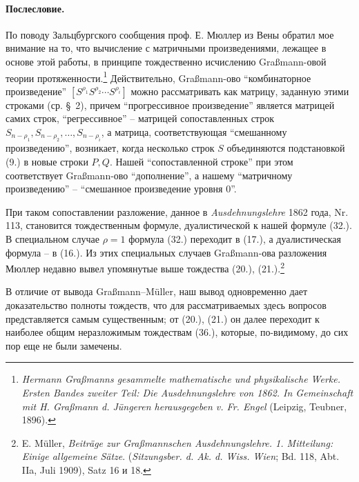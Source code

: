 \documentclass[11pt]{article}
\begin{document}
\paragraph{Послесловие.} По поводу Зальцбургского сообщения проф. Е. Мюллер из Вены обратил мое внимание на то, что вычисление с матричными произведениями, лежащее в основе этой работы, в принципе тождественно исчислению Graßmann-овой теории протяженности.\footnote{\emph{Hermann Graßmanns gesammelte mathematische und physikalische Werke. Ersten Bandes zweiter Teil: Die Ausdehnungslehre von 1862. In Gemeinschaft mit H. Graßmann d. Jüngeren herausgegeben v. Fr. Engel} (Leipzig, Teubner, 1896).} Действительно, Graßmann-ово ``комбинаторное произведение'' $[S^{\rho_1}S^{\rho_2}\cdots S^{\rho_i}]$ можно рассматривать как матрицу, заданную этими строками (ср. \S\ 2), причем ``прогрессивное произведение'' является матрицей самих строк, ``регрессивное'' -- матрицей сопоставленных строк $S_{n-\rho_1},S_{n-\rho_2},\ldots,S_{n-\rho_i}$, а матрица, соответствующая ``смешанному произведению'', возникает, когда несколько строк $S$ объединяются подстановкой (9.) в новые строки $P,Q$. Нашей ``сопоставленной строке'' при этом соответствует Graßmann-ово ``дополнение'', а нашему ``матричному произведению'' -- ``смешанное произведение уровня 0''.

При таком сопоставлении разложение, данное в \emph{Ausdehnungslehre} 1862 года, Nr. 113, становится тождественным формуле, дуалистической к нашей формуле (32.). В специальном случае $\rho=1$ формула (32.) переходит в (17.), а дуалистическая формула -- в (16.). Из этих специальных случаев Graßmann-ова разложения Мюллер недавно вывел упомянутые выше тождества (20.), (21.).\footnote{E. Müller, \emph{Beiträge zur Graßmannschen Ausdehnungslehre. 1. Mitteilung: Einige allgemeine Sätze}. (\emph{Sitzungsber. d. Ak. d. Wiss. Wien}; Bd. 118, Abt. IIa, Juli 1909), Satz 16 и 18.}

В отличие от вывода Graßmann--Müller, наш вывод одновременно дает доказательство полноты тождеств, что для рассматриваемых здесь вопросов представляется самым существенным; от (20.), (21.) он далее переходит к наиболее общим неразложимым тождествам (36.), которые, по-видимому, до сих пор еще не были замечены.
\end{document}
